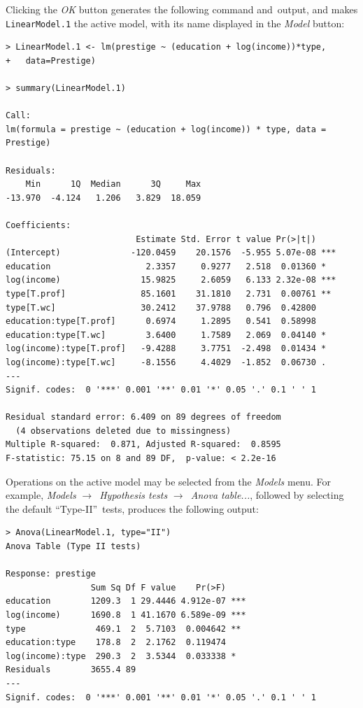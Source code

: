 \documentclass{article}%
\begin{document}
Clicking the \emph{OK} button generates the following command and\ output, and
makes \texttt{LinearModel.1} the active model, with its name displayed in the
\emph{Model} button:
\begin{verbatim}
> LinearModel.1 <- lm(prestige ~ (education + log(income))*type,
+   data=Prestige)

> summary(LinearModel.1)

Call:
lm(formula = prestige ~ (education + log(income)) * type, data = Prestige)

Residuals:
    Min      1Q  Median      3Q     Max
-13.970  -4.124   1.206   3.829  18.059

Coefficients:
                          Estimate Std. Error t value Pr(>|t|)
(Intercept)              -120.0459    20.1576  -5.955 5.07e-08 ***
education                   2.3357     0.9277   2.518  0.01360 *
log(income)                15.9825     2.6059   6.133 2.32e-08 ***
type[T.prof]               85.1601    31.1810   2.731  0.00761 **
type[T.wc]                 30.2412    37.9788   0.796  0.42800
education:type[T.prof]      0.6974     1.2895   0.541  0.58998
education:type[T.wc]        3.6400     1.7589   2.069  0.04140 *
log(income):type[T.prof]   -9.4288     3.7751  -2.498  0.01434 *
log(income):type[T.wc]     -8.1556     4.4029  -1.852  0.06730 .
---
Signif. codes:  0 '***' 0.001 '**' 0.01 '*' 0.05 '.' 0.1 ' ' 1

Residual standard error: 6.409 on 89 degrees of freedom
  (4 observations deleted due to missingness)
Multiple R-squared:  0.871, Adjusted R-squared:  0.8595
F-statistic: 75.15 on 8 and 89 DF,  p-value: < 2.2e-16
\end{verbatim}

Operations on the active model may be selected from the \emph{Models} menu.
For example, \emph{Models }$\longrightarrow$\emph{\ Hypothesis tests
}$\longrightarrow$\emph{\ Anova table...}, followed by selecting the default
\textquotedblleft Type-II\textquotedblright\ tests, produces the following output:
\begin{verbatim}
> Anova(LinearModel.1, type="II")
Anova Table (Type II tests)

Response: prestige
                 Sum Sq Df F value    Pr(>F)
education        1209.3  1 29.4446 4.912e-07 ***
log(income)      1690.8  1 41.1670 6.589e-09 ***
type              469.1  2  5.7103  0.004642 **
education:type    178.8  2  2.1762  0.119474
log(income):type  290.3  2  3.5344  0.033338 *
Residuals        3655.4 89
---
Signif. codes:  0 '***' 0.001 '**' 0.01 '*' 0.05 '.' 0.1 ' ' 1
\end{verbatim}
\end{document}
